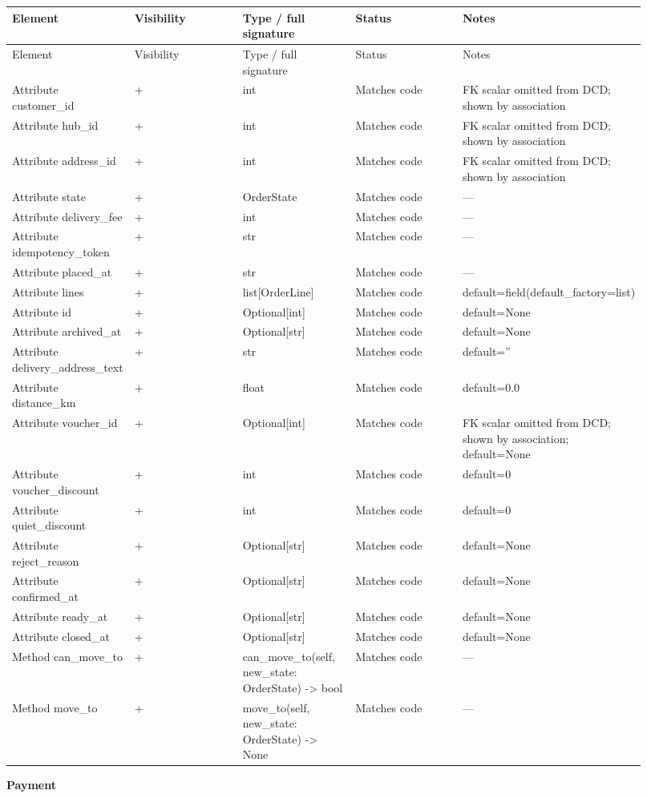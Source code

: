 \begin{longtable}{>{\raggedright\arraybackslash}p{0.1840\linewidth}>{\raggedright\arraybackslash}p{0.1840\linewidth}>{\raggedright\arraybackslash}p{0.1840\linewidth}>{\raggedright\arraybackslash}p{0.1840\linewidth}>{\raggedright\arraybackslash}p{0.1840\linewidth}}
Element & Visibility & Type / full signature & Status & Notes \\
\hline\endfirsthead
Element & Visibility & Type / full signature & Status & Notes \\
\hline\endhead
Attribute customer\_id & + & int & Matches code & FK scalar omitted from DCD; shown by association \\
Attribute hub\_id & + & int & Matches code & FK scalar omitted from DCD; shown by association \\
Attribute address\_id & + & int & Matches code & FK scalar omitted from DCD; shown by association \\
Attribute state & + & OrderState & Matches code & --- \\
Attribute delivery\_fee & + & int & Matches code & --- \\
Attribute idempotency\_token & + & str & Matches code & --- \\
Attribute placed\_at & + & str & Matches code & --- \\
Attribute lines & + & list[OrderLine] & Matches code & default=field(default\_factory=list) \\
Attribute id & + & Optional[int] & Matches code & default=None \\
Attribute archived\_at & + & Optional[str] & Matches code & default=None \\
Attribute delivery\_address\_text & + & str & Matches code & default='' \\
Attribute distance\_km & + & float & Matches code & default=0.0 \\
Attribute voucher\_id & + & Optional[int] & Matches code & FK scalar omitted from DCD; shown by association; default=None \\
Attribute voucher\_discount & + & int & Matches code & default=0 \\
Attribute quiet\_discount & + & int & Matches code & default=0 \\
Attribute reject\_reason & + & Optional[str] & Matches code & default=None \\
Attribute confirmed\_at & + & Optional[str] & Matches code & default=None \\
Attribute ready\_at & + & Optional[str] & Matches code & default=None \\
Attribute closed\_at & + & Optional[str] & Matches code & default=None \\
Method can\_move\_to & + & can\_move\_to(self, new\_state: OrderState) -\textgreater{} bool & Matches code & --- \\
Method move\_to & + & move\_to(self, new\_state: OrderState) -\textgreater{} None & Matches code & --- \\
\end{longtable}
\textbf{Payment}

